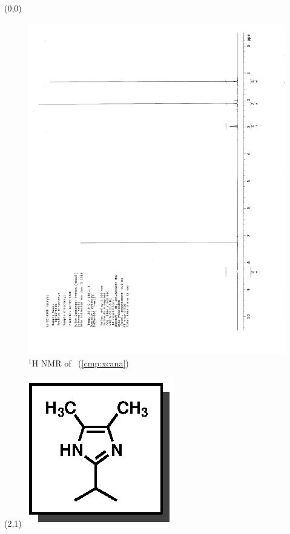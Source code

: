 \begin{textblock}{20}(0,0)
\begin{figure}[htb]
\caption{$^1$H NMR of \CMPxcana\ (\ref{cmp:xcana})}
\includegraphics[scale=0.75, trim = 0mm 0mm 0mm 5mm,
clip]{chp_alkylation/images/nmr/xcanaH}
\vspace{-100pt}
\end{figure}
\end{textblock}
\begin{textblock}{1}(2,1)
\includegraphics[scale=0.8, angle=90]{chp_alkylation/images/xcana}
\end{textblock}
